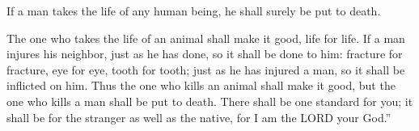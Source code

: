\begin{scripture}[Leviticus 24:17-22]
     If a man takes the life of any human being, he shall surely be put to death.
    \begin{poetry}
        The one who takes the life of an animal shall make it good, life for life.
        If a man injures his neighbor, just as he has done, so it shall be done to him:
        fracture for fracture, eye for eye, tooth for tooth; just as he has injured a man, so it shall be inflicted on him.
        Thus the one who kills an animal shall make it good, but the one who kills a man shall be put to death.
        There shall be one standard for you; it shall be for the stranger as well as the native, for I am the LORD your God.''
    \end{poetry}
\end{scripture}

\vspace{8\baselineskip}
